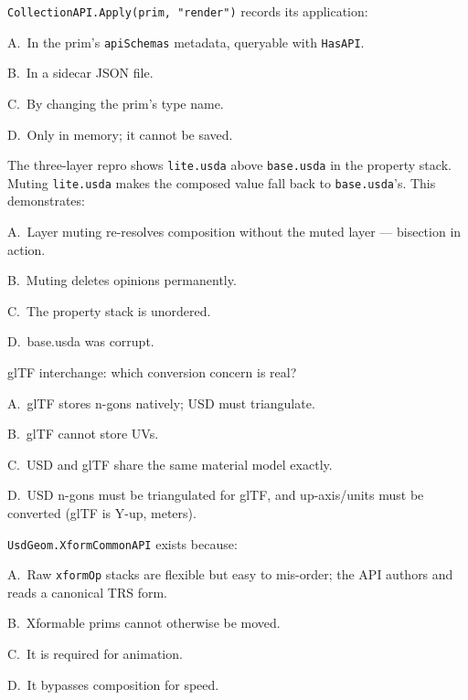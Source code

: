 \texttt{CollectionAPI.Apply(prim, "render")} records its application:
\begin{Choices}
  \item A.\ In the prim's \texttt{apiSchemas} metadata, queryable with \texttt{HasAPI}.
  \item B.\ In a sidecar JSON file.
  \item C.\ By changing the prim's type name.
  \item D.\ Only in memory; it cannot be saved.
\end{Choices}

The three-layer repro shows \texttt{lite.usda} above \texttt{base.usda} in
the property stack. Muting \texttt{lite.usda} makes the composed value fall
back to \texttt{base.usda}'s. This demonstrates:
\begin{Choices}
  \item A.\ Layer muting re-resolves composition without the muted layer --- bisection in action.
  \item B.\ Muting deletes opinions permanently.
  \item C.\ The property stack is unordered.
  \item D.\ base.usda was corrupt.
\end{Choices}

glTF interchange: which conversion concern is real?
\begin{Choices}
  \item A.\ glTF stores n-gons natively; USD must triangulate.
  \item B.\ glTF cannot store UVs.
  \item C.\ USD and glTF share the same material model exactly.
  \item D.\ USD n-gons must be triangulated for glTF, and up-axis/units must be converted (glTF is Y-up, meters).
\end{Choices}

\texttt{UsdGeom.XformCommonAPI} exists because:
\begin{Choices}
  \item A.\ Raw \texttt{xformOp} stacks are flexible but easy to mis-order; the API authors and reads a canonical TRS form.
  \item B.\ Xformable prims cannot otherwise be moved.
  \item C.\ It is required for animation.
  \item D.\ It bypasses composition for speed.
\end{Choices}

